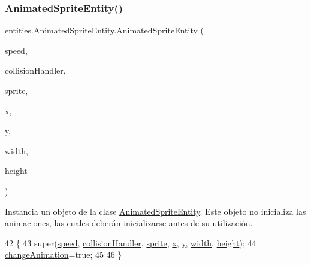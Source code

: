 \subsubsection{\texorpdfstring{Animated\+Sprite\+Entity()}{AnimatedSpriteEntity()}\hspace{0.1cm}{\footnotesize\ttfamily [2/2]}}
{\footnotesize\ttfamily entities.\+Animated\+Sprite\+Entity.\+Animated\+Sprite\+Entity (\begin{DoxyParamCaption}\item[{float}]{speed,  }\item[{\mbox{\hyperlink{classentities_1_1_collision_handler}{Collision\+Handler}}}]{collision\+Handler,  }\item[{\mbox{\hyperlink{classorg_1_1newdawn_1_1slick_1_1_image}{Image}}}]{sprite,  }\item[{float}]{x,  }\item[{float}]{y,  }\item[{float}]{width,  }\item[{float}]{height }\end{DoxyParamCaption})\hspace{0.3cm}{\ttfamily [inline]}}

Instancia un objeto de la clase \mbox{\hyperlink{classentities_1_1_animated_sprite_entity}{Animated\+Sprite\+Entity}}. Este objeto no inicializa las animaciones, las cuales deberán inicializarse antes de su utilización. 
\begin{DoxyCode}
42                                                                                                            
                                      \{
43         super(\mbox{\hyperlink{classentities_1_1_mobile_entity_a815a9d2b23a0bb7e3ee7739d4c10d7c3}{speed}}, \mbox{\hyperlink{classentities_1_1_mobile_entity_a29fbe797671b1fc81eafe1e48fdc46f9}{collisionHandler}}, \mbox{\hyperlink{classentities_1_1_physical_entity_aeb439b2308ab19fb6d3ff6be6f7cdbd8}{sprite}}, \mbox{\hyperlink{classorg_1_1newdawn_1_1slick_1_1geom_1_1_shape_a3e985bfff386c15a4efaad03d8ad60d3}{x}}, \mbox{\hyperlink{classorg_1_1newdawn_1_1slick_1_1geom_1_1_shape_a9f934baded6a1b65ebb69e7e5f80ea00}{y}}, 
      \mbox{\hyperlink{classorg_1_1newdawn_1_1slick_1_1geom_1_1_rectangle_a967e1823f62daf45abb142779d1be62d}{width}}, \mbox{\hyperlink{classorg_1_1newdawn_1_1slick_1_1geom_1_1_rectangle_a3bd010fdce636fc11ed0e0ad4d4b4a0a}{height}});
44         \mbox{\hyperlink{classentities_1_1_animated_sprite_entity_ac5b06797e6a716cb04b883d92301fabf}{changeAnimation}}=\textcolor{keyword}{true};
45 
46     \}
\end{DoxyCode}



